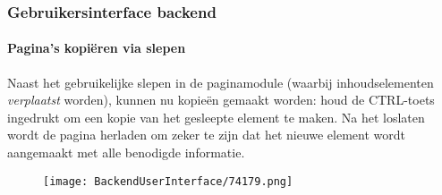 \begin{frame}[fragile]
	\frametitle{Gebruikersinterface backend}
	\framesubtitle{Pagina's kopiëren via slepen}

	Naast het gebruikelijke slepen in de paginamodule (waarbij inhoudselementen \textit{verplaatst} worden),
	kunnen nu kopieën gemaakt worden: houd de CTRL-toets ingedrukt om een kopie van het gesleepte element
	te maken. Na het loslaten wordt de pagina herladen om zeker te zijn dat het nieuwe element wordt aangemaakt
	met alle benodigde informatie.

	\begin{figure}
		\texttt{[image: BackendUserInterface/74179.png]}
	\end{figure}

\end{frame}

